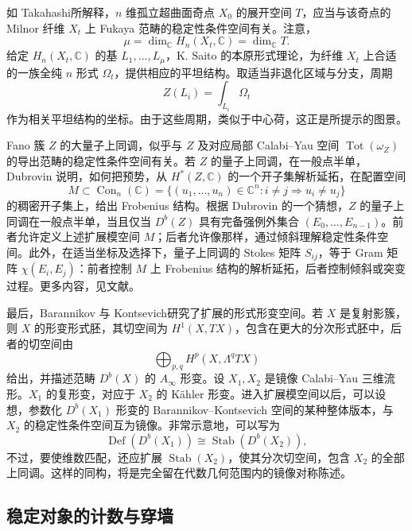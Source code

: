 如 Takahashi所解释，$n$ 维孤立超曲面奇点 $X_0$ 的展开空间 $T$，应当与该奇点的 Milnor 纤维 $X_t$ 上 Fukaya 范畴的稳定性条件空间有关。注意，
\[
\mu=\dim_{\mathbb C}H_n(X_t,\mathbb{C})=\dim_{\mathbb C}T.
\]
给定 $H_n(X_t,\mathbb{C})$ 的基 $L_1,\ldots,L_\mu$，K. Saito 的本原形式理论，为纤维 $X_t$ 上合适的一族全纯 $n$ 形式 $\Omega_t$，提供相应的平坦结构。取适当非退化区域与分支，周期
\[
Z(L_i)=\int_{L_i}\Omega_t
\]
作为相关平坦结构的坐标。由于这些周期，类似于中心荷，这正是所提示的图景。

Fano 簇 $Z$ 的大量子上同调，似乎与 $Z$ 及对应局部 Calabi--Yau 空间 $\operatorname{Tot}(\omega_Z)$ 的导出范畴的稳定性条件空间有关。若 $Z$ 的量子上同调，在一般点半单，Dubrovin 说明，如何把预势，从 $H^*(Z,\mathbb{C})$ 的一个开子集解析延拓，在配置空间
\[
M\subset\operatorname{Con}_n(\mathbb{C})
=\{(u_1,\ldots,u_n)\in\mathbb{C}^n:i\ne j\Rightarrow u_i\ne u_j\}
\]
的稠密开子集上，给出 Frobenius 结构。根据 Dubrovin 的一个猜想，$Z$ 的量子上同调在一般点半单，当且仅当 $D^b(Z)$ 具有完备强例外集合 $(E_0,\ldots,E_{n-1})$。前者允许定义上述扩展模空间 $M$；后者允许像那样，通过倾斜理解稳定性条件空间。此外，在适当坐标及选择下，量子上同调的 Stokes 矩阵 $S_{ij}$，等于 Gram 矩阵 $\chi(E_i,E_j)$：前者控制 $M$ 上 Frobenius 结构的解析延拓，后者控制倾斜或突变过程。更多内容，见文献。

最后，Barannikov 与 Kontsevich研究了扩展的形式形变空间。若 $X$ 是复射影簇，则 $X$ 的形变形式胚，其切空间为 $H^1(X,TX)$，包含在更大的分次形式胚中，后者的切空间由
\[
\bigoplus_{p,q}H^p(X,\Lambda^qTX)
\]
给出，并描述范畴 $D^b(X)$ 的 $A_\infty$ 形变。设 $X_1,X_2$ 是镜像 Calabi--Yau 三维流形。$X_1$ 的复形变，对应于 $X_2$ 的 K\"ahler 形变。进入扩展模空间以后，可以设想，参数化 $D^b(X_1)$ 形变的 Barannikov--Kontsevich 空间的某种整体版本，与 $X_2$ 的稳定性条件空间互为镜像。非常示意地，可以写为
\[
\operatorname{Def}(D^b(X_1))\cong\operatorname{Stab}(D^b(X_2)),
\]
不过，要使维数匹配，还应扩展 $\operatorname{Stab}(X_2)$，使其分次切空间，包含 $X_2$ 的全部上同调。这样的同构，将是完全留在代数几何范围内的镜像对称陈述。

\subsection{稳定对象的计数与穿墙}\label{sec:5.9.2}

